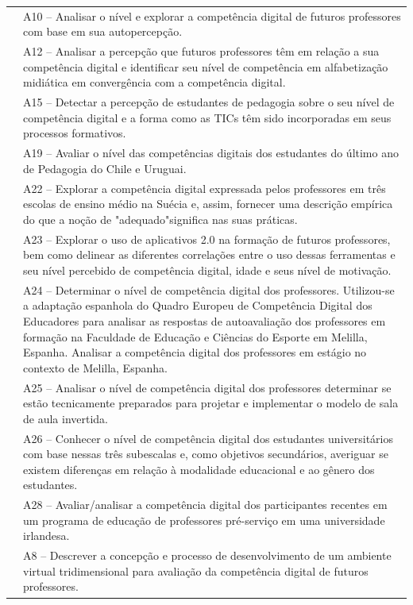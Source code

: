 \documentclass[portuguese]{textolivre}
\begin{document}
\begin{footnotesize}
\begin{longtable}{
    >{\raggedright\arraybackslash}p{}
    >{\raggedright\arraybackslash}p{}
    }
										 & A10 – Analisar o nível e explorar a competência digital de futuros professores com base em sua autopercepção.\\
										 & A12 – Analisar a percepção que futuros professores têm em relação a sua competência digital e identificar seu nível de competência em alfabetização midiática em convergência com a competência digital.\\
										 & A15 – Detectar a percepção de estudantes de pedagogia sobre o seu nível de competência digital e a forma como as TICs têm sido incorporadas em seus processos formativos.\\
										 & A19 – Avaliar o nível das competências digitais dos estudantes do último ano de Pedagogia do Chile e Uruguai.\\
										 & A22 – Explorar a competência digital expressada pelos professores em três escolas de ensino médio na Suécia e, assim, fornecer uma descrição empírica do que a noção de "adequado"significa nas suas práticas.\\
										 & A23 – Explorar o uso de aplicativos 2.0 na formação de futuros professores, bem como delinear as diferentes correlações entre o uso dessas ferramentas e seu nível percebido de competência digital, idade e seus nível de motivação.\\
										 & A24 – Determinar o nível de competência digital dos professores. Utilizou-se a adaptação espanhola do Quadro Europeu de Competência Digital dos Educadores para analisar as respostas de autoavaliação dos professores em formação na Faculdade de Educação e Ciências do Esporte em Melilla, Espanha. Analisar a competência digital dos professores em estágio no contexto de Melilla, Espanha.\\
										 & A25 – Analisar o nível de competência digital dos professores determinar se estão tecnicamente preparados para projetar e implementar o modelo de sala de aula invertida.\\
										 & A26 – Conhecer o nível de competência digital dos estudantes universitários com base nessas três subescalas e, como objetivos secundários, averiguar se existem diferenças em relação à modalidade educacional e ao gênero dos estudantes.\\
										 & A28 – Avaliar/analisar a competência digital dos participantes recentes em um programa de educação de professores pré-serviço em uma universidade irlandesa. \\
\midrule
\multirow[t]{2}{=}{Criação de instrumentos e ambientes para avaliação da CD} & A8 – Descrever a concepção e processo de desenvolvimento de um ambiente virtual tridimensional para avaliação da competência digital de futuros professores.\\

\end{longtable}
\end{footnotesize}
\end{document}

